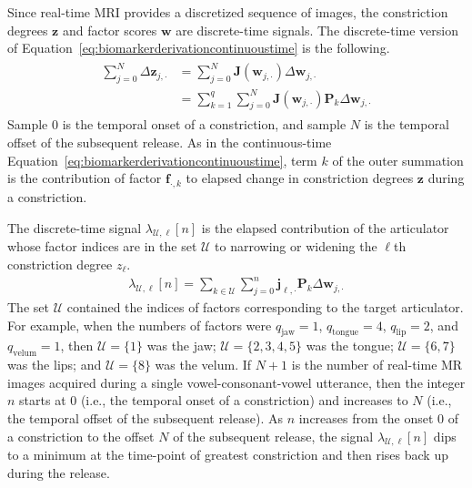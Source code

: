 \documentclass[preprint]{JASAnew}\usepackage[]{graphicx}\usepackage[]{color}
\begin{document}
Since real-time MRI provides a discretized sequence of images, the constriction degrees $\mathbf{z}$ and factor scores $\mathbf{w}$ are discrete-time signals. 
%
The discrete-time version of Equation~\ref{eq:biomarkerderivationcontinuoustime} is the following.
%
\begin{align}
\begin{split}
\sum_{j=0}^{N} \Delta \mathbf{z}_{j,\cdot}
	&= \sum_{j=0}^{N} \mathbf{J}\left( \mathbf{w}_{j,\cdot} \right) \Delta \mathbf{w}_{j,\cdot} \\
    &= \sum_{k=1}^q \sum_{j=0}^{N} \mathbf{J}\left( \mathbf{w}_{j,\cdot} \right) \mathbf{P}_k \Delta \mathbf{w}_{j,\cdot}
\end{split}
\end{align}
%
Sample $0$ is the temporal onset of a constriction, and sample $N$ is the temporal offset of the subsequent release.
%
As in the continuous-time Equation~\ref{eq:biomarkerderivationcontinuoustime}, term $k$ of the outer summation is the contribution of factor $\mathbf{f}_{\cdot,k}$ to elapsed change in constriction degrees $\mathbf{z}$ during a constriction.



The discrete-time signal $\lambda_{\mathcal{U},\ell}[n]$ is the elapsed contribution of the articulator whose factor indices are in the set $\mathcal{U}$ to narrowing or widening the $\ell$th constriction degree $z_\ell$. 
\begin{align}
\lambda_{\mathcal{U},\ell} \left[ n \right]
	= \sum_{k\in \mathcal{U}} \sum_{j=0}^{n} \mathbf{j}_{\ell,\cdot} \mathbf{P}_k \Delta \mathbf{w}_{j,\cdot}
\end{align}
The set $\mathcal{U}$ contained the indices of factors corresponding to the target articulator. For example, when the numbers of factors were $q_\text{jaw} = 1$, $q_\text{tongue} = 4$, $q_\text{lip} = 2$, and $q_\text{velum} = 1$, then  $\mathcal{U}=\{1\}$ was the jaw; $\mathcal{U}=\{2,3,4,5\}$ was the tongue; $\mathcal{U}=\{6,7\}$ was the lips; and $\mathcal{U}=\{8\}$ was the velum.
%
If $N+1$ is the number of real-time MR images acquired during a single vowel-consonant-vowel utterance, then the integer $n$ starts at $0$ (i.e., the temporal onset of a constriction) and increases to $N$ (i.e., the temporal offset of the subsequent release). 
%
As $n$ increases from the onset $0$ of a constriction to the offset $N$ of the subsequent release, the signal $\lambda_{\mathcal{U},\ell}[n]$ dips to a minimum at the time-point of greatest constriction and then rises back up during the release.
\end{document}
